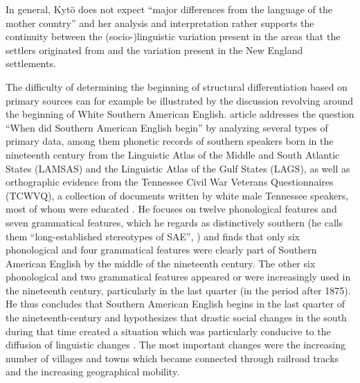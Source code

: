 In general, Kytö does not expect “major differences from the language of the mother country” and her analysis and interpretation rather supports the continuity between the (socio-)linguistic variation present in the areas that the settlers originated from and the variation present in the New England settlements.

The difficulty of determining the beginning of structural differentiation based on primary sources can for example be illustrated by the discussion revolving around the beginning of White Southern American English.  article addresses the question “When did Southern American English begin” by analyzing several types of primary data, among them phonetic records of southern speakers born in the nineteenth century from the Linguistic Atlas of the Middle and South Atlantic States (LAMSAS) and the Linguistic Atlas of the Gulf States (LAGS), as well as orthographic evidence from the Tennessee Civil War Veterans Questionnaires (TCWVQ), a  collection of documents written by white male Tennessee speakers, most of whom were educated \citep[260]{Bailey1997}. He focuses on twelve phonological features and seven grammatical features, which he regards as distinctively southern (he calls them “long-established stereotypes of SAE”, \citeyear[258]{Bailey1997}) and finds that only six phonological and four grammatical features were clearly part of Southern American English by the middle of the nineteenth century. The other six phonological and two grammatical features appeared or were increasingly used in the nineteenth century, particularly in the last quarter (in the period after 1875). He thus concludes that Southern American English begins in the last quarter of the nineteenth-century and hypothesizes that drastic social changes in the south during that time created a situation which was particularly conducive to the diffusion of linguistic changes \citep[271]{Bailey1997}. The most important changes were the increasing number of villages and towns which became connected through railroad tracks and the increasing geographical mobility.

